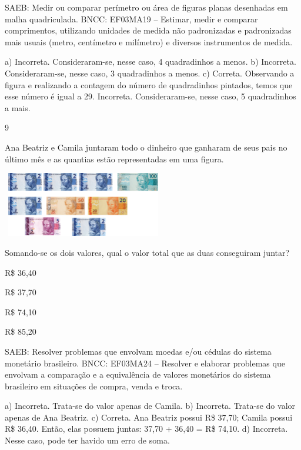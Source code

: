 \begin{escolha}
{\begin{escolha}
{SAEB: Medir ou comparar perímetro ou área de figuras planas
desenhadas em malha quadriculada.
BNCC: EF03MA19 -- Estimar, medir e comparar comprimentos, utilizando unidades de medida
não padronizadas e padronizadas mais usuais (metro, centímetro e milímetro) e diversos
instrumentos de medida.

a) Incorreta. Consideraram-se, nesse caso, 4 quadradinhos a menos.
b) Incorreta. Consideraram-se, nesse caso, 3 quadradinhos a menos.
c) Correta. Observando a figura e realizando a contagem do número de quadradinhos
pintados, temos que esse número é igual a 29.
Incorreta. Consideraram-se, nesse caso, 5 quadradinhos a mais.

\num{9}

Ana Beatriz e Camila juntaram todo o dinheiro que ganharam de seus pais no
último mês e as quantias estão representadas em uma figura.


\includegraphics[width=2.77564in,height=1.11703in]{media/image110.png}


Somando-se os dois valores, qual o valor total que as duas conseguiram juntar?

\begin{escolha}
\item
  R\$ 36,40
\item
  R\$ 37,70
\item
  R\$ 74,10
\item
  R\$ 85,20
\end{escolha}

SAEB: Resolver problemas que envolvam moedas e/ou cédulas do
sistema monetário brasileiro.
BNCC: EF03MA24 -- Resolver e elaborar problemas que envolvam a comparação e a equivalência de
valores monetários do sistema brasileiro em situações de compra, venda e troca.

a) Incorreta. Trata-se do valor apenas de Camila.
b) Incorreta. Trata-se do valor apenas de Ana Beatriz.
c) Correta. Ana Beatriz possui R\$ 37,70; Camila possui R\$ 36,40. Então, elas possuem juntas: 37,70 + 36,40 = R\$ 74,10.
d) Incorreta. Nesse caso, pode ter havido um erro de soma.

}
\end{escolha}}
\end{escolha}

